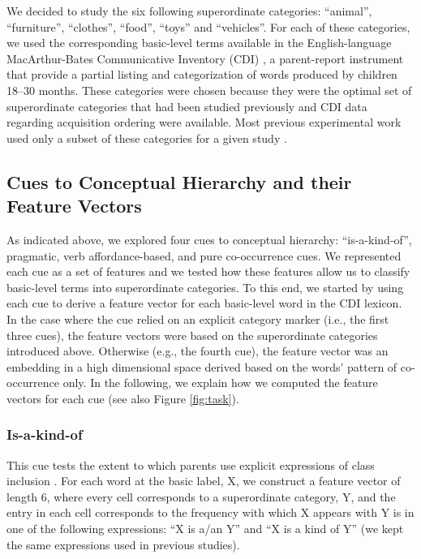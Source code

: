 \documentclass[10pt, letterpaper]{article}
\begin{document}
We decided to study the six following superordinate categories:
``animal'', ``furniture'', ``clothes'', ``food'', ``toys'' and
``vehicles''. For each of these categories, we used the corresponding
basic-level terms available in the English-language MacArthur-Bates Communicative Inventory (CDI) \cite{fenson1994}, a parent-report instrument that provide a partial listing and categorization of words produced by children 18--30 months.
These categories were chosen because they were the optimal set of
superordinate categories that had been studied previously and CDI data regarding acquisition ordering were available.
Most previous experimental work used only a subset of these categories for a given study \cite{callanan1985,bornstein2010,wright2015}.

\hypertarget{cues-to-conceptual-hierarchy-and-their-feature-vectors}{%
\subsection{Cues to Conceptual Hierarchy and their Feature
Vectors}\label{cues-to-conceptual-hierarchy-and-their-feature-vectors}}

As indicated above, we explored four cues to conceptual hierarchy:
``is-a-kind-of'', pragmatic, verb affordance-based, and pure co-occurrence cues.
We represented each cue as a set of features and we tested how these
features allow us to classify basic-level terms into superordinate
categories. To this end, we started by using each cue to derive a feature vector for each basic-level
word in the CDI lexicon. In the case where the cue
relied on an explicit category marker (i.e., the first three cues), the
feature vectors were based on the superordinate categories introduced
above. Otherwise (e.g., the fourth cue), the feature vector was an
embedding in a high dimensional space derived based on the words'
pattern of co-occurrence only. In the following, we explain how we
computed the feature vectors for each cue (see also Figure \ref{fig:task}).

\hypertarget{is-a-kind-of}{%
\subsubsection{Is-a-kind-of}\label{is-a-kind-of}}

This cue tests the extent to which parents use explicit expressions of
class inclusion \cite{callanan1985}. For each word at the basic label, X,
we construct a feature vector of length 6, where every cell
corresponds to a superordinate category, Y, and the entry in each cell
corresponds to the frequency with which X appears with Y is in one of
the following expressions: ``X is a/an Y'' and ``X is a kind of Y'' (we
kept the same expressions used in previous studies).
\end{document}
